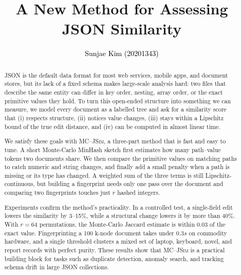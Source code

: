 \documentclass[sigconf]{acmart}
\begin{document}
\title{{A New Method for Assessing JSON Similarity}}

\author{\textcolor{black}{Sunjae Kim (20201343)}}

\renewcommand{\shortauthors}{{Kim et al.}}

\begin{abstract}
JSON is the default data format for most web services, mobile apps, and document stores, but its lack of a fixed schema makes large-scale analysis hard: two files that describe the same entity can differ in key order, nesting, array order, or the exact primitive values they hold. To turn this open-ended structure into something we can measure, we model every document as a labelled tree and ask for a similarity score that (i) respects structure, (ii) notices value changes, (iii) stays within a Lipschitz bound of the true edit distance, and (iv) can be computed in almost linear time.

We satisfy these goals with \textsc{MC--JSim}, a three-part method that is fast and easy to tune. A short Monte-Carlo MinHash sketch first estimates how many path–value tokens two documents share. We then compare the primitive values on matching paths to catch numeric and string changes, and finally add a small penalty when a path is missing or its type has changed. A weighted sum of the three terms is still Lipschitz-continuous, but building a fingerprint needs only one pass over the document and comparing two fingerprints touches just $r$ hashed integers.

Experiments confirm the method’s practicality. In a controlled test, a single-field edit lowers the similarity by 3–15\%, while a structural change lowers it by more than 40\%. With $r=64$ permutations, the Monte-Carlo Jaccard estimate is within 0.03 of the exact value. Fingerprinting a 100 k-node document takes under $0.3s$ on commodity hardware, and a single threshold clusters a mixed set of laptop, keyboard, novel, and report records with perfect purity. These results show that \textsc{MC--JSim} is a practical building block for tasks such as duplicate detection, anomaly search, and tracking schema drift in large JSON collections.
\end{abstract}

\renewcommand\footnotetextcopyrightpermission[1]{} %
\end{document}

